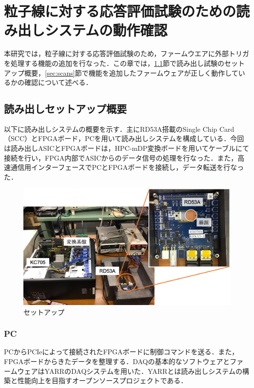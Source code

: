 \chapter{粒子線に対する応答評価試験のための読み出しシステムの動作確認}
本研究では，粒子線に対する応答評価試験のため，ファームウエアに外部トリガを処理する機能の追加を行なった．この章では，\ref{sec:setup}節で読み出し試験のセットアップ概要，\ref{sec:scans}節で機能を追加したファームウェアが正しく動作しているかの確認について述べる．

\section{読み出しセットアップ概要}
\label{sec:setup}
以下に読み出しシステムの概要を示す．主にRD53A搭載のSingle Chip Card（SCC）とFPGAボード，PCを用いて読み出しシステムを構成している．今回は読み出しASICとFPGAボードは，HPC-mDP変換ボードを用いてケーブルにて接続を行い，FPGA内部でASICからのデータ信号の処理を行なった．また，高速通信用インターフェースでPCとFPGAボードを接続し，データ転送を行なった．\par

\begin{figure}[h]
  \centering
  \includegraphics[width=15cm]{./figure/Setup.png}
  \caption{セットアップ}
  \label{fig:setup}
\end{figure}

\subsection*{PC}
PCからPCIeによって接続されたFPGAボードに制御コマンドを送る．また，FPGAボードからきたデータを整理する．DAQの基本的なソフトウェアとファームウェアはYARRのDAQシステムを用いた．YARRとは読み出しシステムの構築と性能向上を目指すオープンソースプロジェクトである．

